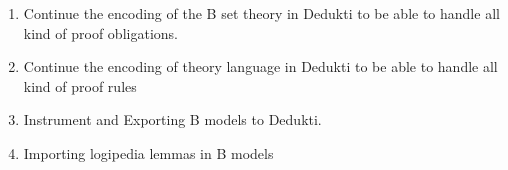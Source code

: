 





\begin{enumerate}

  \item Continue the encoding of the B set theory in Dedukti to be
  able to handle all kind of proof obligations.
  
  \item Continue the encoding of theory language in Dedukti to be 
  able to handle all kind of proof rules


  \item Instrument and Exporting B models to Dedukti.
  
  \item Importing logipedia lemmas in B models
  
\end{enumerate}



